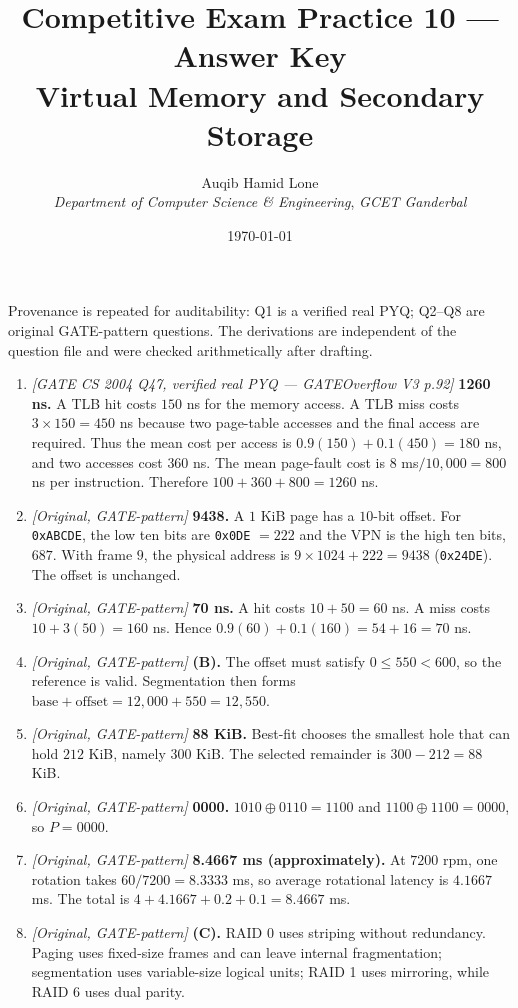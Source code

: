 \documentclass[11pt]{article}
\title{Competitive Exam Practice 10 --- Answer Key\\
  \large Virtual Memory and Secondary Storage}
\author{Auqib Hamid Lone\\[0.3em]
  \emph{Department of Computer Science \& Engineering}, \emph{GCET Ganderbal}}
\date{\today}
\begin{document}
\maketitle

\noindent Provenance is repeated for auditability: Q1 is a verified real PYQ;
Q2--Q8 are original GATE-pattern questions. The derivations are independent
of the question file and were checked arithmetically after drafting.

\begin{enumerate}
\item[\textbf{Q1}] \textit{[GATE CS 2004 Q47, verified real PYQ ---
GATEOverflow V3 p.92]} \textbf{1260 ns.} A TLB hit costs $150$ ns for the
memory access. A TLB miss costs $3\times150=450$ ns because two page-table
accesses and the final access are required. Thus the mean cost per access is
$0.9(150)+0.1(450)=180$ ns, and two accesses cost $360$ ns. The mean page-fault
cost is $8$ ms$/10{,}000=800$ ns per instruction. Therefore
$100+360+800=1260$ ns.

\item[\textbf{Q2}] \textit{[Original, GATE-pattern]} \textbf{9438.} A $1$ KiB
page has a $10$-bit offset. For \texttt{0xABCDE}, the low ten bits are
\texttt{0x0DE} $=222$ and the VPN is the high ten bits, $687$. With frame $9$,
the physical address is $9\times1024+222=9438$ (\texttt{0x24DE}). The offset
is unchanged.

\item[\textbf{Q3}] \textit{[Original, GATE-pattern]} \textbf{70 ns.} A hit
costs $10+50=60$ ns. A miss costs $10+3(50)=160$ ns. Hence
$0.9(60)+0.1(160)=54+16=70$ ns.

\item[\textbf{Q4}] \textit{[Original, GATE-pattern]} \textbf{(B).} The
offset must satisfy $0\leq550<600$, so the reference is valid. Segmentation
then forms $\text{base}+\text{offset}=12{,}000+550=12{,}550$.

\item[\textbf{Q5}] \textit{[Original, GATE-pattern]} \textbf{88 KiB.}
Best-fit chooses the smallest hole that can hold $212$ KiB, namely $300$ KiB.
The selected remainder is $300-212=88$ KiB.

\item[\textbf{Q6}] \textit{[Original, GATE-pattern]} \textbf{0000.}
$1010\mathbin{\mathop{\oplus}}0110=1100$ and
$1100\mathbin{\mathop{\oplus}}1100=0000$, so
$P=0000$.

\item[\textbf{Q7}] \textit{[Original, GATE-pattern]} \textbf{8.4667 ms
(approximately).} At $7200$ rpm, one rotation takes
$60/7200=8.3333$ ms, so average rotational latency is $4.1667$ ms. The
total is $4+4.1667+0.2+0.1=8.4667$ ms.

\item[\textbf{Q8}] \textit{[Original, GATE-pattern]} \textbf{(C).} RAID 0
uses striping without redundancy. Paging uses fixed-size frames and can leave
internal fragmentation; segmentation uses variable-size logical units; RAID 1
uses mirroring, while RAID 6 uses dual parity.
\end{enumerate}
\end{document}
